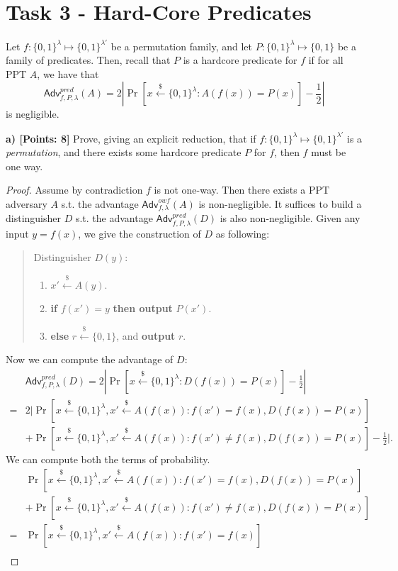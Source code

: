 \documentclass[12pt]{article}
\newcommand{\bits}{\{0,1\}}
\newcommand{\getsr}{\stackrel{\$}{\gets}}
\newcommand{\Adv}{\textsf{Adv}}
\theoremstyle{definition}
\begin{document}
\section{Task 3 - Hard-Core Predicates}
Let $f : \bits^\lambda \mapsto \bits^{\lambda'}$ be a permutation family, and let $P : \bits^\lambda \mapsto \bits$ be a family of predicates. Then, recall that $P$ is a hardcore predicate for $f$ if for all PPT $A$, we have that
$$\Adv_{f,P,\lambda}^{pred}(A) = 2 \left| \Pr[x\getsr\bits^\lambda : A(f(x)) = P(x)] -\frac{1}{2}\right|$$
is negligible.

{\bf a) [Points: 8]} Prove, giving an explicit reduction, that if $f : \bits^\lambda \mapsto \bits^{\lambda'}$ is a \emph{permutation}, and there exists some hardcore predicate $P$ for $f$, then $f$ must be one way.
\begin{proof}
Assume by contradiction $f$ is not one-way. Then there exists a PPT adversary $A$ s.t. the advantage $\Adv_{f,\lambda}^{owf}(A)$ is non-negligible. It suffices to build a distinguisher $D$ s.t. the advantage $\Adv_{f,P,\lambda}^{pred}(D)$ is also non-negligible. Given any input $y=f(x)$, we give the construction of $D$ as following:
\begin{quote}
Distinguisher $D(y)$:
\begin{enumerate}
\item $x' \getsr A(y)$.
\item {\bf if} $f(x') = y$ {\bf then output} $P(x')$.
\item {\bf else} $r\getsr\bits$, and {\bf output} $r$. 
\end{enumerate}
\end{quote}
Now we can compute the advantage of $D$:
$$
\begin{aligned}
&\Adv_{f,P,\lambda}^{pred}(D) = 2 \left| \Pr[x\getsr\bits^\lambda : D(f(x)) = P(x)] -\frac{1}{2}\right| \\
=& 2 \bigg| \Pr[x\getsr\bits^\lambda, x'\getsr A(f(x)) : f(x')=f(x), D(f(x)) = P(x)] \\
&+ \Pr[x\getsr\bits^\lambda, x'\getsr A(f(x)) : f(x')\not=f(x), D(f(x)) = P(x)] -\frac{1}{2}\bigg|.
\end{aligned}
$$
We can compute both the terms of probability.
$$
\begin{aligned}
&\Pr[x\getsr\bits^\lambda, x'\getsr A(f(x)) : f(x')=f(x), D(f(x)) = P(x)] \\
&+\Pr[x\getsr\bits^\lambda, x'\getsr A(f(x)) : f(x')\not=f(x), D(f(x)) = P(x)] \\
=&\Pr[x\getsr\bits^\lambda, x'\getsr A(f(x)) : f(x')=f(x)]\\

\end{aligned}$$
\end{proof}
\end{document}
